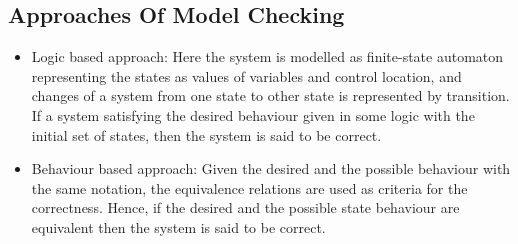 \documentclass[a4paper,12pt]{extarticle}
\begin{document}
\subsection{Approaches Of Model Checking}
\label{Appr to model check}
\begin{itemize}
\item Logic based approach: Here the system is modelled as finite-state automaton representing the states as values of variables and control location, and changes of a system from one state to other state is represented by transition. If a system satisfying the desired behaviour given in some logic with the initial set of states, then the system is said to be correct.
\item Behaviour based approach: Given the desired and the possible behaviour with the same notation, the equivalence relations are used as criteria for the correctness. Hence, if the desired and the possible state behaviour are equivalent then the system is said to be correct.  
\end{itemize}
\end{document}
